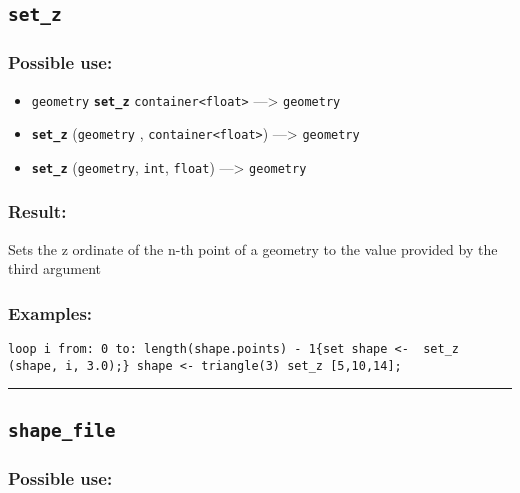 \documentclass[]{book}
\providecommand{\tightlist}{%
  \setlength{\itemsep}{0pt}\setlength{\parskip}{0pt}}
\theoremstyle{definition}
\theoremstyle{definition}
\theoremstyle{definition}
\theoremstyle{remark}
\begin{document}
\subsection{\texorpdfstring{\texttt{set\_z}}{set\_z}}\label{set_z}

\subsubsection{Possible use:}\label{possible-use-469}

\begin{itemize}
\tightlist
\item
  \texttt{geometry} \textbf{\texttt{set\_z}}
  \texttt{container\textless{}float\textgreater{}} ---\textgreater{}
  \texttt{geometry}
\item
  \textbf{\texttt{set\_z}} (\texttt{geometry} ,
  \texttt{container\textless{}float\textgreater{}}) ---\textgreater{}
  \texttt{geometry}
\item
  \textbf{\texttt{set\_z}} (\texttt{geometry}, \texttt{int},
  \texttt{float}) ---\textgreater{} \texttt{geometry}
\end{itemize}

\subsubsection{Result:}\label{result-453}

Sets the z ordinate of the n-th point of a geometry to the value
provided by the third argument

\subsubsection{Examples:}\label{examples-326}

\begin{verbatim}
loop i from: 0 to: length(shape.points) - 1{set shape <-  set_z (shape, i, 3.0);} shape <- triangle(3) set_z [5,10,14]; 
\end{verbatim}

\begin{center}\rule{0.5\linewidth}{\linethickness}\end{center}

\subsection{\texorpdfstring{\texttt{shape\_file}}{shape\_file}}\label{shape_file}

\subsubsection{Possible use:}\label{possible-use-470}
\end{document}

